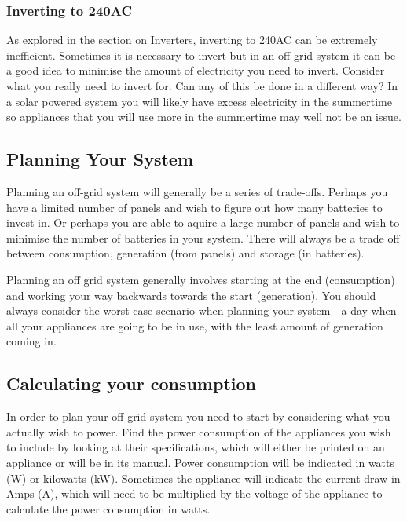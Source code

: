 \documentclass{article}
\theoremstyle{definition}
\theoremstyle{definition}
\theoremstyle{remark}
\begin{document}

    \subsubsection{Inverting to 240AC} %
    \label{ssub:inverting_to_240ac}

      As explored in the section on Inverters, inverting to 240AC can be extremely inefficient. Sometimes it is necessary to invert but in an off-grid system it can be a good idea to minimise the amount of electricity you need to invert. Consider what you really need to invert for. Can any of this be done in a different way? In a solar powered system you will likely have excess electricity in the summertime so appliances that you will use more in the summertime may well not be an issue.
    
  

  {\color{blue}\subsection{Planning Your System}} %
  \label{sub:planning_your_system}

    Planning an off-grid system will generally be a series of trade-offs. Perhaps you have a limited number of panels and wish to figure out how many batteries to invest in. Or perhaps you are able to aquire a large number of panels and wish to minimise the number of batteries in your system. There will always be a trade off between consumption, generation (from panels) and storage (in batteries). 

    Planning an off grid system generally involves starting at the end (consumption) and working your way backwards towards the start (generation). You should always consider the worst case scenario when planning your system - a day when all your appliances are going to be in use, with the least amount of generation coming in.
  

  {\color{blue}\subsection{Calculating your consumption}} %
  \label{sub:calculating_your_consumption}

    In order to plan your off grid system you need to start by considering what you actually wish to power. Find the power consumption of the appliances you wish to include by looking at their specifications, which will either be printed on an appliance or will be in its manual. Power consumption will be indicated in watts (W) or kilowatts (kW). Sometimes the appliance will indicate the current draw in Amps (A), which will need to be multiplied by the voltage of the appliance to calculate the power consumption in watts.
\end{document}
